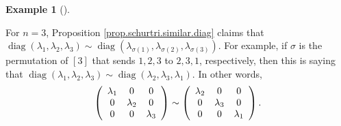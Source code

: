 \documentclass[numbers=enddot,12pt,final,onecolumn,notitlepage]{scrartcl}%
\numberwithin{exer}{subsection}
\theoremstyle{definition}
\newtheorem{exam}[theo]{Example}
\newenvironment{example}[1][]
{\begin{exam}[#1]\begin{leftbar}}
{\end{leftbar}\end{exam}}
\begin{document}
\begin{example}
For $n=3$, Proposition \ref{prop.schurtri.similar.diag} claims that
$\operatorname*{diag}\left(  \lambda_{1},\lambda_{2},\lambda_{3}\right)
\sim\operatorname*{diag}\left(  \lambda_{\sigma\left(  1\right)  }%
,\lambda_{\sigma\left(  2\right)  },\lambda_{\sigma\left(  3\right)  }\right)
$. For example, if $\sigma$ is the permutation of $\left[  3\right]  $ that
sends $1,2,3$ to $2,3,1$, respectively, then this is saying that
$\operatorname*{diag}\left(  \lambda_{1},\lambda_{2},\lambda_{3}\right)
\sim\operatorname*{diag}\left(  \lambda_{2},\lambda_{3},\lambda_{1}\right)  $.
In other words,%
\[
\left(
\begin{array}
[c]{ccc}%
\lambda_{1} & 0 & 0\\
0 & \lambda_{2} & 0\\
0 & 0 & \lambda_{3}%
\end{array}
\right)  \sim\left(
\begin{array}
[c]{ccc}%
\lambda_{2} & 0 & 0\\
0 & \lambda_{3} & 0\\
0 & 0 & \lambda_{1}%
\end{array}
\right)  .
\]

\end{example}
\end{document}
